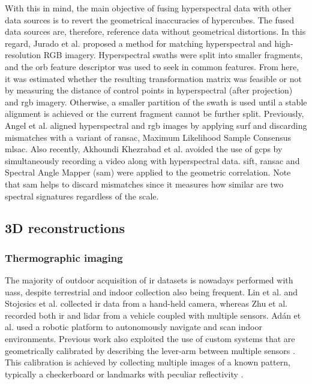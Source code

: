 With this in mind, the main objective of fusing hyperspectral data with other data sources is to revert the geometrical inaccuracies of hypercubes. The fused data sources are, therefore, reference data without geometrical distortions. In this regard, Jurado et al. \cite{jurado_efficient_2021} proposed a method for matching hyperspectral and high-resolution RGB imagery. Hyperspectral swaths were split into smaller fragments, and the \acrshort{orb} feature descriptor was used to seek in common features. From here, it was estimated whether the resulting transformation matrix was feasible or not by measuring the distance of control points in hyperspectral (after projection) and \acrshort{rgb} imagery. Otherwise, a smaller partition of the swath is used until a stable alignment is achieved or the current fragment cannot be further split. Previously, Angel et al. \cite{angel_automated_2020} aligned hyperspectral and \acrshort{rgb} images by applying \acrshort{surf} and discarding mismatches with a variant of \acrshort{ransac}, Maximum Likelihood Sample Consensus \acrshort{mlsac}. Also recently, Akhoundi Khezrabad et al. \cite{akhoundi_khezrabad_new_2022} avoided the use of \acrshort{gcp}s by simultaneously recording a video along with hyperspectral data. \acrshort{sift}, \acrshort{ransac} and Spectral Angle Mapper (\acrshort{sam}) were applied to the geometric correlation. Note that \acrshort{sam} helps to discard mismatches since it measures how similar are two spectral signatures regardless of the scale.

\subsection{3D reconstructions}

\subsubsection{Thermographic imaging}

The majority of outdoor acquisition of \acrshort{ir} datasets is nowadays performed with \acrshort{uas}s, despite terrestrial and indoor collection also being frequent. Lin et al. \cite{lin_fusion_2019} and Stojcsics et al. \cite{stojcsics_high_2018} collected \acrshort{ir} data from a hand-held camera, whereas Zhu et al. \cite{zhu_fusion_2021} recorded both \acrshort{ir} and \acrshort{lidar} from a vehicle coupled with multiple sensors. Adán et al. \cite{adan_towards_2020} used a robotic platform to autonomously navigate and scan indoor environments. Previous work also exploited the use of custom systems that are geometrically calibrated by describing the lever-arm between multiple sensors \cite{javadnejad_photogrammetric_2020, hoegner_fusion_2018}. This calibration is achieved by collecting multiple images of a known pattern, typically a checkerboard \cite{javadnejad_photogrammetric_2020} or landmarks with peculiar reflectivity \cite{adan_fusion_2017}. 

